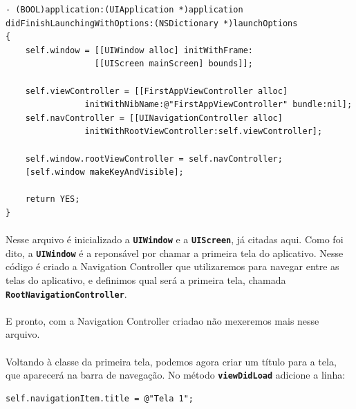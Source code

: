 \documentclass[a4paper,12pt,brazil,doubleside]{book}
\begin{document}
\begin{listing}
\begin{verbatim}
- (BOOL)application:(UIApplication *)application
didFinishLaunchingWithOptions:(NSDictionary *)launchOptions
{
    self.window = [[UIWindow alloc] initWithFrame:
                  [[UIScreen mainScreen] bounds]];
    
    self.viewController = [[FirstAppViewController alloc]
                initWithNibName:@"FirstAppViewController" bundle:nil];
    self.navController = [[UINavigationController alloc]
                initWithRootViewController:self.viewController];
   
    self.window.rootViewController = self.navController;
    [self.window makeKeyAndVisible];
    
    return YES;
}
\end{verbatim}
\end{listing}

\paragraph{}Nesse arquivo é inicializado a \texttt{\textbf{UIWindow}} e a \texttt{\textbf{UIScreen}}, já citadas aqui. Como foi dito, a \texttt{\textbf{UIWindow}} é a reponsável por chamar a primeira tela do aplicativo. Nesse código é criado a Navigation Controller que utilizaremos para navegar entre as telas do aplicativo, e definimos qual será a primeira tela, chamada \texttt{\textbf{RootNavigationController}}.
\paragraph{}E pronto, com a Navigation Controller criadao não mexeremos mais nesse arquivo.\\

\paragraph{}Voltando à classe da primeira tela, podemos agora criar um título para a tela, que aparecerá na barra de navegação. No método \texttt{\textbf{viewDidLoad}} adicione a linha:

\begin{listing}
\begin{verbatim}
self.navigationItem.title = @"Tela 1";
\end{verbatim}
\end{listing}
\end{document}
